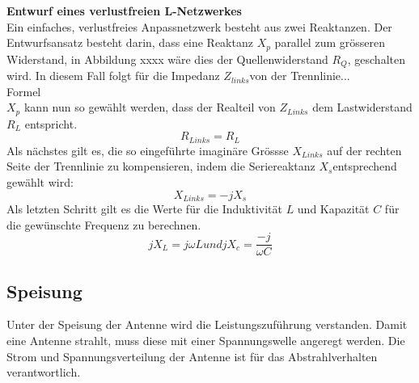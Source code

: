 \textbf{Entwurf eines verlustfreien L-Netzwerkes}\\
Ein einfaches, verlustfreies Anpassnetzwerk besteht aus zwei Reaktanzen. Der Entwurfsansatz besteht darin, dass eine Reaktanz $X_{p}$ parallel zum grösseren Widerstand, in Abbildung xxxx wäre dies der Quellenwiderstand $R_{Q}$, geschalten wird. In diesem Fall folgt für die Impedanz $Z_{links} $von der Trennlinie... \\
Formel\\
$X_p$  kann nun so gewählt werden, dass der Realteil von $Z_{Links}$  dem Lastwiderstand $R_L$ entspricht. \\
\begin{equation}
R_{Links}= R_L
\end{equation}
Als nächstes gilt es, die so eingeführte imaginäre Grössse $X_{Links}$ auf der rechten Seite der 
Trennlinie zu kompensieren, indem die Seriereaktanz $X_{s}$entsprechend gewählt wird: 
\begin{equation}
X_{Links}= -jX_s
\end{equation}
Als letzten Schritt gilt es die Werte für die Induktivität $L$ und Kapazität $C$ für die gewünschte Frequenz zu berechnen. 
\begin{equation}
jX_{L}= j\omega L und jX_c=\dfrac{-j}{\omega C}
\end{equation}




\subsection{Speisung}
Unter der Speisung der Antenne wird die Leistungszuführung verstanden. Damit eine Antenne strahlt, muss diese mit einer Spannungswelle angeregt werden. Die Strom und Spannungsverteilung der Antenne ist für das Abstrahlverhalten verantwortlich. 


